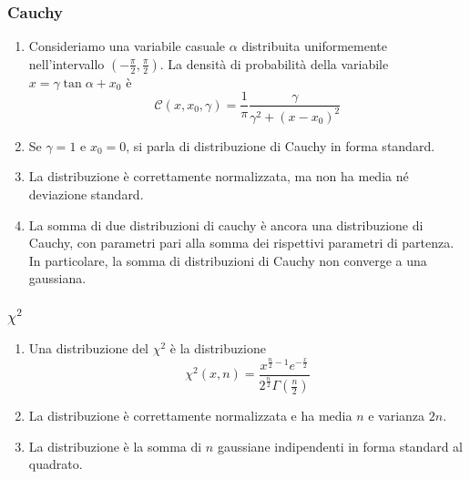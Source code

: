 \documentclass[a4paper,11pt]{article}
\begin{document}
\subsubsection{Cauchy}
\begin{enumerate}[resume]
	\item Consideriamo una variabile casuale $\alpha$ distribuita uniformemente nell'intervallo $(-\frac{\pi}{2},\frac{\pi}{2})$. La densità di probabilità della variabile $x=\gamma\tan\alpha+x_0$ è
	\[\mathcal{C}(x,x_0,\gamma)=\frac{1}{\pi}\frac{\gamma}{\gamma^2+(x-x_0)^2}\]
	\item Se $\gamma=1$ e $x_0=0$, si parla di distribuzione di Cauchy in forma standard.
	\item La distribuzione è correttamente normalizzata, ma non ha media né deviazione standard. 
	\item La somma di due distribuzioni di cauchy è ancora una distribuzione di Cauchy, con parametri pari alla somma dei rispettivi parametri di partenza. In particolare, la somma di distribuzioni di Cauchy non converge a una gaussiana.
\end{enumerate}
\subsubsection{$\chi^2$}
\begin{enumerate}[resume]
	\item Una distribuzione del $\chi^2$ è la distribuzione
	\[\chi^2(x,n)=\frac{x^{\frac{n}{2}-1}e^{-\frac{x}{2}}}{2^{\frac{n}{2}}\Gamma\left(\frac{n}{2}\right)}\]
	\item La distribuzione è correttamente normalizzata e ha media $n$ e varianza $2n$.
	\item La distribuzione è la somma di $n$ gaussiane indipendenti in forma standard al quadrato.
\end{enumerate}
\end{document}
